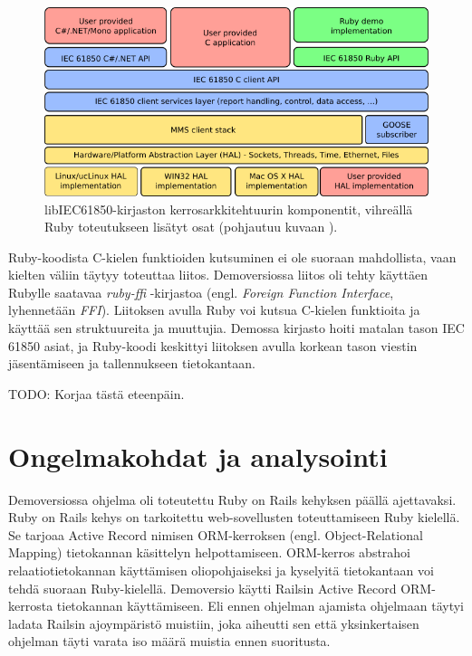 \begin{figure}[ht!]
	\includegraphics[width=1\textwidth]{pictures/libiec61850-layer-architecture.png}
	\caption{libIEC61850-kirjaston kerrosarkkitehtuurin komponentit, vihreällä Ruby toteutukseen lisätyt osat (pohjautuu kuvaan \mbox{\cite{libIEC61850-api-overview}}).}
	\label{fig:libiec61850-layer-architecture}
\end{figure}

Ruby-koodista C-kielen funktioiden kutsuminen ei ole suoraan mahdollista, vaan kielten väliin täytyy toteuttaa liitos. Demoversiossa liitos oli tehty käyttäen Rubylle saatavaa \emph{ruby-ffi} -kirjastoa \cite{ruby-ffi-repo} (engl. \emph{Foreign Function Interface}, lyhennetään \emph{FFI}). Liitoksen avulla Ruby voi kutsua C-kielen funktioita ja käyttää sen struktuureita ja muuttujia. Demossa kirjasto hoiti matalan tason IEC 61850 asiat, ja Ruby-koodi keskittyi liitoksen avulla korkean tason viestin jäsentämiseen ja tallennukseen tietokantaan.

TODO: Korjaa tästä eteenpäin.

\section{Ongelmakohdat ja analysointi}
\label{ch:ongelmakohdat-ja-analysointi}
Demoversiossa ohjelma oli toteutettu Ruby on Rails kehyksen päällä ajettavaksi. Ruby on Rails kehys on tarkoitettu web-sovellusten toteuttamiseen Ruby kielellä. Se tarjoaa Active Record nimisen ORM-kerroksen (engl. Object-Relational Mapping) tietokannan käsittelyn helpottamiseen. ORM-kerros abstrahoi relaatiotietokannan käyttämisen oliopohjaiseksi ja kyselyitä tietokantaan voi tehdä suoraan Ruby-kielellä. Demoversio käytti Railsin Active Record ORM-kerrosta tietokannan käyttämiseen. Eli ennen ohjelman ajamista ohjelmaan täytyi ladata Railsin ajoympäristö muistiin, joka aiheutti sen että yksinkertaisen ohjelman täyti varata iso määrä muistia ennen suoritusta.

